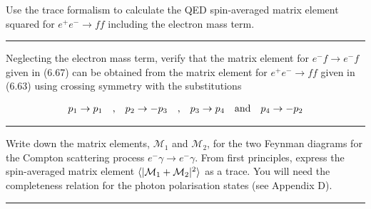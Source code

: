 
\begin{problem}{6.10}
Use the trace formalism to calculate the QED spin-averaged matrix element squared for $e^+e^-\to ff$ including the electron mass term.
\end{problem}
\begin{solution}

\end{solution}

\noindent\rule{7in}{1.5pt}


\begin{problem}{6.11}
Neglecting the electron mass term, verify that the matrix element for $e^- f \to e^- f$ given in (6.67) can be obtained from the matrix element for $e^+e^-\to ff$ given in (6.63) using crossing symmetry with the substitutions

\begin{align*}
    p_1 \to p_1 \quad \text{,} \quad p_2 \to -p_3 \quad \text{,} \quad p_3 \to p_4 \quad \text{and} \quad p_4 \to -p_2 \\
\end{align*}

\end{problem}
\begin{solution}

\end{solution}

\noindent\rule{7in}{1.5pt}


\begin{problem}{6.12}
Write down the matrix elements, $\mathcal{M}_1$ and $\mathcal{M}_2$, for the two Feynman diagrams for the Compton scattering process $e^-\gamma\to e^-\gamma$. From first principles, express the spin-averaged matrix element $\langle |\mathcal{M}_1+\mathcal{M}_2|^2 \rangle$ as a trace. You will need the completeness relation for the photon polarisation states (see Appendix D).
\end{problem}
\begin{solution}

\end{solution}

\noindent\rule{7in}{1.5pt}

